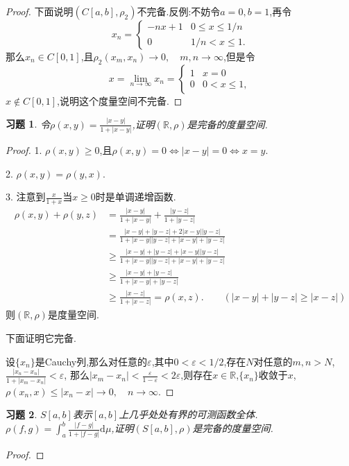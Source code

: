 \documentclass[a4paper,oneside,12pt]{ctexart}
\theoremstyle{plain}
\newtheorem{exercise}{习题}
\theoremstyle{nonumberplain}
\theoremstyle{nonumberplain}
\newtheorem{proof}{证明.}
\newcommand{\dif}{\mathrm{d}}
\newcommand{\R}{\mathbb{R}}
\renewcommand{\epsilon}{\varepsilon}
\newcommand{\abs}[1]{\left\vert#1\right\vert}
\begin{document}
\begin{proof}
    下面说明$(C[a,b],\rho_2)$不完备.反例:不妨令$a=0,b=1$,再令
    $$x_n=\begin{cases}
        -nx+1 & 0\leqslant x\leqslant 1/n\\
        0 & 1/n<x\leqslant 1.
    \end{cases}$$
    那么$x_n\in C[0,1]$,且$\rho_2(x_m,x_n)\to 0,\quad m,n\to \infty$,但是令
    $$x=\lim_{n\to\infty}x_n=\begin{cases}
        1 & x=0\\
        0 & 0<x\leqslant 1,
    \end{cases}$$
    $x\notin C[0,1]$,说明这个度量空间不完备.
\end{proof}

\begin{exercise}
    \label{ex:2}
    令$\rho(x,y)=\frac{\abs{x-y}}{1+\abs{x-y}}$,证明$(\R,\rho)$是完备的度量空间.
\end{exercise}

\begin{proof}
    1. $\rho(x,y)\geqslant 0$,且$\rho(x,y)=0\Leftrightarrow \abs{x-y}=0\Leftrightarrow x=y$.

    2. $\rho(x,y)=\rho(y,x)$.

    3. 注意到$\frac{x}{1+x}$当$x\geqslant 0$时是单调递增函数.\begin{align*}
        \rho(x,y)+\rho(y,z)&=\frac{\abs{x-y}}{1+\abs{x-y}}+\frac{\abs{y-z}}{1+\abs{y-z}}\\
        &=\frac{\abs{x-y}+\abs{y-z}+2\abs{x-y}\abs{y-z}}{1+\abs{x-y}\abs{y-z}+\abs{x-y}+\abs{y-z}}\\
        &\geqslant \frac{\abs{x-y}+\abs{y-z}+\abs{x-y}\abs{y-z}}{1+\abs{x-y}\abs{y-z}+\abs{x-y}+\abs{y-z}}\\
        &\geqslant \frac{\abs{x-y}+\abs{y-z}}{1+\abs{x-y}+\abs{y-z}}\\
        &\geqslant\frac{\abs{x-z}}{1+\abs{x-z}}=\rho(x,z).\qquad (\abs{x-y}+\abs{y-z}\geqslant \abs{x-z})
    \end{align*}
    则$(\R,\rho)$是度量空间.

    下面证明它完备.

    设$\{x_n\}$是Cauchy列,那么对任意的$\epsilon$,其中$0<\epsilon<1/2$,存在$N$对任意的$m,n>N$,$\frac{\abs{x_n-x_n}}{1+\abs{x_m-x_n}}<\epsilon$,
    那么$\abs{x_m-x_n}<\frac{\epsilon}{1-\epsilon}<2\epsilon$,则存在$x\in\R$,$\{x_n\}$收敛于$x$,$\rho(x_n,x)\leqslant \abs{x_n-x}\to 0,\quad n\to\infty$.
\end{proof}

\begin{exercise}
    \label{ex:3}
    $S[a,b]$表示$[a,b]$上几乎处处有界的可测函数全体.$\rho(f,g)=\int_a^b\frac{\abs{f-g}}{1+\abs{f-g}}\dif \mu$,证明$(S[a,b],\rho)$是完备的度量空间.
\end{exercise}

\begin{proof}
    
\end{proof}
\end{document}

